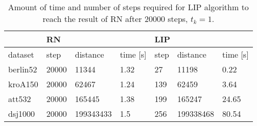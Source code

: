 \begin{table}[!htb]
	\centering
	\footnotesize
	\begin{tabular}{|l|lll|lll|}
		\hline
		& \multicolumn{3}{l|}{RN}                                                    & \multicolumn{3}{l|}{LIP}                                                  \\ \hline
		dataset  & \multicolumn{1}{l|}{step}  & \multicolumn{1}{l|}{distance}  & time {[}s{]} & \multicolumn{1}{l|}{step} & \multicolumn{1}{l|}{distance}  & time {[}s{]} \\ \hline
		berlin52 & \multicolumn{1}{l|}{20000} & \multicolumn{1}{l|}{11344}     & 1.32         & \multicolumn{1}{l|}{27}   & \multicolumn{1}{l|}{11198}     & 0.22         \\ \hline
		kroA150  & \multicolumn{1}{l|}{20000} & \multicolumn{1}{l|}{62467}     & 1.24         & \multicolumn{1}{l|}{139}  & \multicolumn{1}{l|}{62459}     & 3.64         \\ \hline
		att532   & \multicolumn{1}{l|}{20000} & \multicolumn{1}{l|}{165445}    & 1.38         & \multicolumn{1}{l|}{199}  & \multicolumn{1}{l|}{165247}    & 24.65        \\ \hline
		dsj1000  & \multicolumn{1}{l|}{20000} & \multicolumn{1}{l|}{199343433} & 1.5          & \multicolumn{1}{l|}{256}  & \multicolumn{1}{l|}{199338468} & 80.54        \\ \hline
	\end{tabular}
	\caption{Amount of time and number of steps required for LIP algorithm to reach the result of RN after 20000 steps, $t_k=1$.}
\end{table}